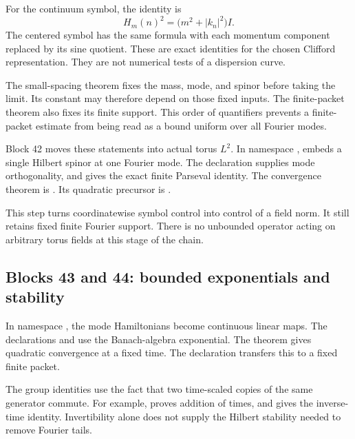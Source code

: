 For the continuum symbol, the identity is
\[
 H_m(n)^2=\bigl(m^2+|k_n|^2\bigr)I.
\]
The centered symbol has the same formula with each momentum component replaced by its sine quotient. These are exact identities for the chosen Clifford representation. They are not numerical tests of a dispersion curve.

The small-spacing theorem  fixes the mass, mode, and spinor before taking the limit. Its constant may therefore depend on those fixed inputs. The finite-packet theorem also fixes its finite support. This order of quantifiers prevents a finite-packet estimate from being read as a bound uniform over all Fourier modes.

Block 42 moves these statements into actual torus \(L^2\). In namespace ,  embeds a single Hilbert spinor at one Fourier mode. The declaration  supplies mode orthogonality, and  gives the exact finite Parseval identity. The convergence theorem is . Its quadratic precursor is .

This step turns coordinatewise symbol control into control of a field norm. It still retains fixed finite Fourier support. There is no unbounded operator acting on arbitrary torus fields at this stage of the chain.

\subsection{Blocks 43 and 44: bounded exponentials and stability}

In namespace , the mode Hamiltonians become continuous linear maps. The declarations  and  use the Banach-algebra exponential. The theorem  gives quadratic convergence at a fixed time. The declaration  transfers this to a fixed finite packet.

The group identities use the fact that two time-scaled copies of the same generator commute. For example,  proves addition of times, and  gives the inverse-time identity. Invertibility alone does not supply the Hilbert stability needed to remove Fourier tails.

